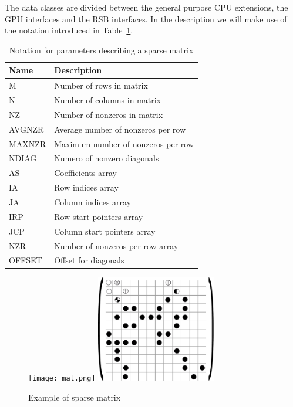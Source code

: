 The data classes are divided between the general purpose CPU
extensions, the GPU interfaces and the RSB interfaces.
In the description we will make use of the notation introduced in
Table~\ref{tab:notation}. 

\begin{table}[ht]
\caption{Notation for parameters describing a sparse matrix}
\begin{center}
{\footnotesize
\begin{tabular}{ll}
\hline
Name & Description \\
\hline
M		& Number of rows in matrix		 \\
N		& Number of columns in matrix		 \\
NZ              & Number of nonzeros in matrix   \\
AVGNZR          & Average number of nonzeros per row  \\
MAXNZR          & Maximum number of nonzeros per row  \\
NDIAG           & Numero of nonzero diagonals\\
AS	        & Coefficients 	array		 \\
IA	        & Row indices array			 \\
JA	        & Column  indices array			 \\
IRP	        & Row start pointers array			 \\
JCP	        & Column start pointers array			 \\
NZR 	        & Number of nonzeros per row array \\
OFFSET          & Offset for diagonals			 \\
\hline
\end{tabular}
}
\end{center}
\label{tab:notation}
\end{table}

\begin{figure}[ht]
	\centering
\ifcase\pdfoutput
  \texttt{[image: mat.png]}
\or
  \includegraphics[width=5.2cm]{figures/mat.pdf}
\fi
	\caption{Example of sparse matrix}
	\label{fig:dense}
\end{figure} 

